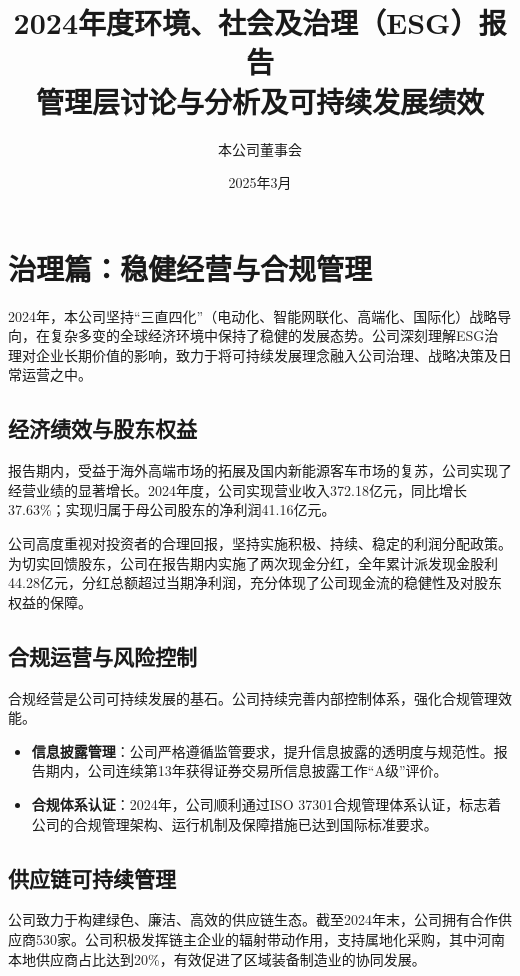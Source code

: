 \documentclass[a4paper,12pt]{article}
\title{\textbf{\huge 2024年度环境、社会及治理（ESG）报告}\\ \vspace{0.5em} \large 管理层讨论与分析及可持续发展绩效}
\author{本公司董事会}
\date{2025年3月}
\begin{document}
\maketitle

\section{治理篇：稳健经营与合规管理}

2024年，本公司坚持“三直四化”（电动化、智能网联化、高端化、国际化）战略导向，在复杂多变的全球经济环境中保持了稳健的发展态势。公司深刻理解ESG治理对企业长期价值的影响，致力于将可持续发展理念融入公司治理、战略决策及日常运营之中。

\subsection{经济绩效与股东权益}

报告期内，受益于海外高端市场的拓展及国内新能源客车市场的复苏，公司实现了经营业绩的显著增长。2024年度，公司实现营业收入372.18亿元，同比增长37.63\%；实现归属于母公司股东的净利润41.16亿元。

公司高度重视对投资者的合理回报，坚持实施积极、持续、稳定的利润分配政策。为切实回馈股东，公司在报告期内实施了两次现金分红，全年累计派发现金股利44.28亿元，分红总额超过当期净利润，充分体现了公司现金流的稳健性及对股东权益的保障。

\subsection{合规运营与风险控制}

合规经营是公司可持续发展的基石。公司持续完善内部控制体系，强化合规管理效能。
\begin{itemize}
    \item \textbf{信息披露管理}：公司严格遵循监管要求，提升信息披露的透明度与规范性。报告期内，公司连续第13年获得证券交易所信息披露工作“A级”评价。
    \item \textbf{合规体系认证}：2024年，公司顺利通过ISO 37301合规管理体系认证，标志着公司的合规管理架构、运行机制及保障措施已达到国际标准要求。
\end{itemize}

\subsection{供应链可持续管理}

公司致力于构建绿色、廉洁、高效的供应链生态。截至2024年末，公司拥有合作供应商530家。公司积极发挥链主企业的辐射带动作用，支持属地化采购，其中河南本地供应商占比达到20\%，有效促进了区域装备制造业的协同发展。
\end{document}
